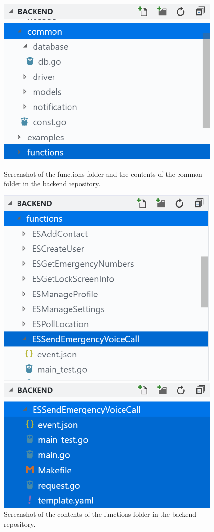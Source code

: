 \documentclass[10pt, a4paper]{article}
\begin{document}
\begin{figure}[H]
  \includegraphics[width=\linewidth]{code-screenshots/one.png}
  \caption{Screenshot of the functions folder and the contents of the common folder in the backend repository.}
\endminipage\hfill
{}
  \includegraphics[width=\linewidth]{code-screenshots/two.png}
  \caption{Screenshot of the contents of the functions folder in the backend repository.}
\endminipage\hfill
{}%
  \includegraphics[width=\linewidth]{code-screenshots/three.png}

\end{figure}
\end{document}
